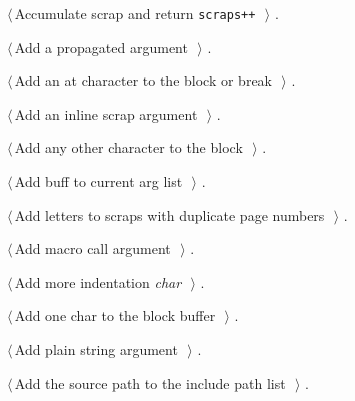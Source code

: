 \documentclass[a4paper]{report}
\begin{document}
{\small\begin{list}{}{\setlength{\itemsep}{-\parsep}\setlength{\itemindent}{-\leftmargin}}
\item $\langle\,$Accumulate scrap and return \verb|scraps++|\nobreak\ {\footnotesize {}}$\,\rangle$ {\footnotesize {\NWtxtRefIn} .}
\item $\langle\,$Add a propagated argument\nobreak\ {\footnotesize {}}$\,\rangle$ {\footnotesize {\NWtxtRefIn} .}
\item $\langle\,$Add an at character to the block or break\nobreak\ {\footnotesize {}}$\,\rangle$ {\footnotesize {\NWtxtRefIn} .}
\item $\langle\,$Add an inline scrap argument\nobreak\ {\footnotesize {}}$\,\rangle$ {\footnotesize {\NWtxtRefIn} .}
\item $\langle\,$Add any other character to the block\nobreak\ {\footnotesize {}}$\,\rangle$ {\footnotesize {\NWtxtRefIn} .}
\item $\langle\,$Add buff to current arg list\nobreak\ {\footnotesize {}}$\,\rangle$ {\footnotesize {\NWtxtRefIn} .
}
\item $\langle\,$Add letters to scraps with duplicate page numbers\nobreak\ {\footnotesize {}}$\,\rangle$ {\footnotesize {\NWtxtRefIn} .}
\item $\langle\,$Add macro call argument\nobreak\ {\footnotesize {}}$\,\rangle$ {\footnotesize {\NWtxtRefIn} .}
\item $\langle\,$Add more indentation \hbox{\slshape\sffamily char\/}\nobreak\ {\footnotesize {}}$\,\rangle$ {\footnotesize {\NWtxtRefIn} .
}
\item $\langle\,$Add one char to the block buffer\nobreak\ {\footnotesize {}}$\,\rangle$ {\footnotesize {\NWtxtRefIn} .}
\item $\langle\,$Add plain string argument\nobreak\ {\footnotesize {}}$\,\rangle$ {\footnotesize {\NWtxtRefIn} .}
\item $\langle\,$Add the source path to the include path list\nobreak\ {\footnotesize {}}$\,\rangle$ {\footnotesize {\NWtxtRefIn} .}

\end{list}}
\end{document}
